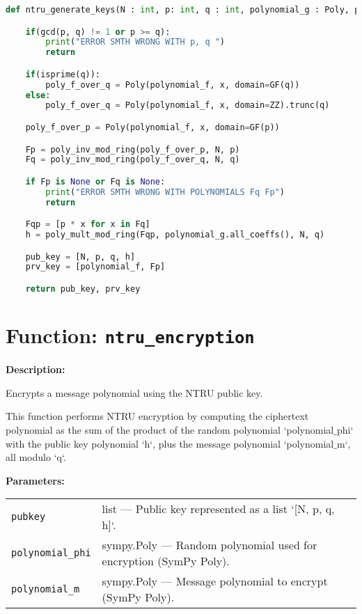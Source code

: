 \documentclass[a4paper,12pt]{article}
\begin{document}
\begin{lstlisting}[language=Python]
def ntru_generate_keys(N : int, p: int, q : int, polynomial_g : Poly, polynomial_f : Poly):

    if(gcd(p, q) != 1 or p >= q):
        print("ERROR SMTH WRONG WITH p, q ")
        return

    if(isprime(q)):
        poly_f_over_q = Poly(polynomial_f, x, domain=GF(q))
    else:
        poly_f_over_q = Poly(polynomial_f, x, domain=ZZ).trunc(q)

    poly_f_over_p = Poly(polynomial_f, x, domain=GF(p))

    Fp = poly_inv_mod_ring(poly_f_over_p, N, p)
    Fq = poly_inv_mod_ring(poly_f_over_q, N, q)

    if Fp is None or Fq is None:
        print("ERROR SMTH WRONG WITH POLYNOMIALS Fq Fp")
        return

    Fqp = [p * x for x in Fq]
    h = poly_mult_mod_ring(Fqp, polynomial_g.all_coeffs(), N, q)

    pub_key = [N, p, q, h]
    prv_key = [polynomial_f, Fp]

    return pub_key, prv_key
\end{lstlisting}

\section*{Function: \texttt{ntru\_encryption}}

\textbf{Description:}

Encrypts a message polynomial using the NTRU public key.

This function performs NTRU encryption by computing the ciphertext polynomial as
the sum of the product of the random polynomial `polynomial$\_$phi` with the public key polynomial `h`,
plus the message polynomial `polynomial$\_$m`, all modulo `q`.

\vspace{1em}
\textbf{Parameters:}

\vspace{1em}
\noindent
\begin{tabular}{p{3cm} p{11cm}}
\texttt{pubkey} & list — Public key represented as a list `[N, p, q, h]`. \\
\texttt{polynomial\_phi} & sympy.Poly — Random polynomial used for encryption (SymPy Poly). \\
\texttt{polynomial\_m} & sympy.Poly — Message polynomial to encrypt (SymPy Poly). \\
\end{tabular}
\end{document}
